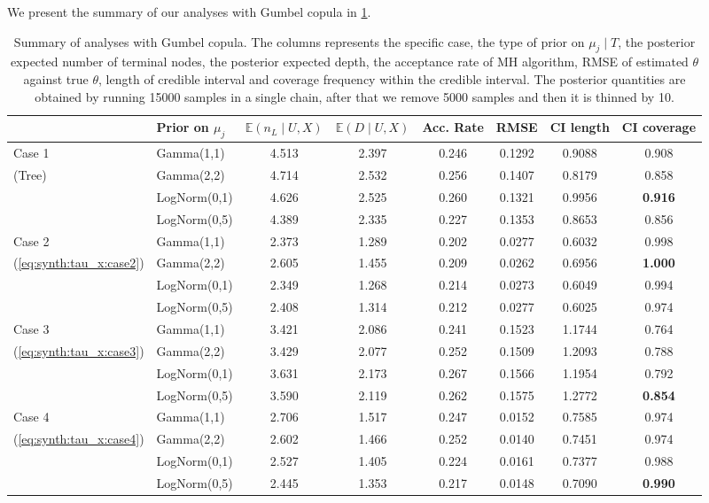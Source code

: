 \documentclass{amsart}
\begin{document}
We present the summary of our analyses with Gumbel copula in \cref{tab:gumbel:summary}. 


\begin{table}[ht]
	\centering
	\caption{Summary of analyses with Gumbel copula. The columns represents the specific case, the type of prior on $\mu_j\mid T$, the posterior expected number of terminal nodes, the posterior expected depth, the acceptance rate of MH algorithm, RMSE of estimated $\theta$ against true $\theta$, length of credible interval and coverage frequency within the credible interval. The posterior quantities are obtained by running 15000 samples in a single chain, after that we remove 5000 samples and then it is thinned by 10.}
	\label{tab:gumbel:summary}
	\scriptsize{
	\begin{tabular}{ll|cccccc}
		\toprule
		& Prior on $\mu_j$ & $\mathbb{E}(n_L\mid U,X)$ & $\mathbb{E}(D\mid U,X)$ & Acc. Rate & RMSE & CI length & CI coverage \\ 
		\hline
		Case 1 & Gamma(1,1) & 4.513 & 2.397 & 0.246 & 0.1292 & 0.9088 & 0.908 \\ 
		(Tree) & Gamma(2,2) & 4.714 & 2.532 & 0.256 & 0.1407 & 0.8179 & 0.858 \\ 
		& LogNorm(0,1) & 4.626 & 2.525 & 0.260 & 0.1321 & 0.9956 & \textbf{0.916} \\ 
		& LogNorm(0,5) & 4.389 & 2.335 & 0.227 & 0.1353 & 0.8653 & 0.856 \\ 
		\midrule
		Case 2 & Gamma(1,1) & 2.373 & 1.289 & 0.202 & 0.0277 & 0.6032 & 0.998 \\ 
		(\cref{eq:synth:tau_x:case2}) & Gamma(2,2) & 2.605 & 1.455 & 0.209 & 0.0262 & 0.6956 & \textbf{1.000} \\ 
		& LogNorm(0,1) & 2.349 & 1.268 & 0.214 & 0.0273 & 0.6049 & 0.994 \\ 
		& LogNorm(0,5) & 2.408 & 1.314 & 0.212 & 0.0277 & 0.6025 & 0.974 \\ 
		\midrule
		Case 3 & Gamma(1,1) & 3.421 & 2.086 & 0.241 & 0.1523 & 1.1744 & 0.764 \\ 
		(\cref{eq:synth:tau_x:case3}) & Gamma(2,2) & 3.429 & 2.077 & 0.252 & 0.1509 & 1.2093 & 0.788 \\ 
		& LogNorm(0,1) & 3.631 & 2.173 & 0.267 & 0.1566 & 1.1954 & 0.792 \\ 
		& LogNorm(0,5) & 3.590 & 2.119 & 0.262 & 0.1575 & 1.2772 & \textbf{0.854} \\ 
		\midrule
		Case 4 & Gamma(1,1) & 2.706 & 1.517 & 0.247 & 0.0152 & 0.7585 & 0.974 \\ 
		(\cref{eq:synth:tau_x:case4}) & Gamma(2,2) & 2.602 & 1.466 & 0.252 & 0.0140 & 0.7451 & 0.974 \\ 
		& LogNorm(0,1) & 2.527 & 1.405 & 0.224 & 0.0161 & 0.7377 & 0.988 \\ 
		& LogNorm(0,5) & 2.445 & 1.353 & 0.217 & 0.0148 & 0.7090 & \textbf{0.990} \\ 
		\end{tabular}}
\end{table}
\end{document}
